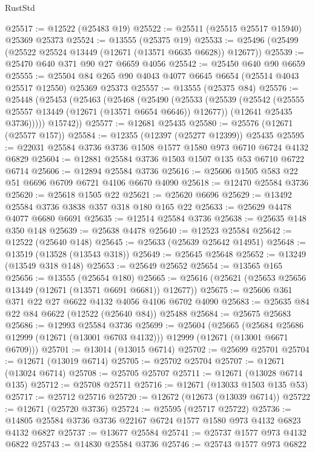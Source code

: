 \begin{lexlean}{RustStd}
\begin{coremodule}
@25517 := @12522 (@25483 @19)
@25522 := @25511 (@25515 @25517 @15940) @25369 @25373
@25524 := @13555 (@25375 @19)
@25533 := @25496 (@25499 (@25522 @25524 @13449 (@12671 (@13571 @6635 @6628)) @12677))
@25539 := @25470 @640 @371 @90 @27 @6659 @4056
@25542 := @25450 @640 @90 @6659
@25555 := @25504 @84 @265 @90 @4043 @4077 @6645 @6654 (@25514 @4043 @25517 @12550) @25369 @25373
@25557 := @13555 (@25375 @84)
@25576 := @25448
    (@25453
      (@25463
        (@25468
          (@25490
            (@25533
              (@25539
                (@25542 (@25555 @25557 @13449 (@12671 (@13571 @6654 @6646)) @12677))
                (@12641 @25435 @3736)))))
        @15742))
@25577 := @12681 @25435
@25580 := @25576 (@12671 (@25577 @157))
@25584 := @12355 (@12397 (@25277 @12399)) @25435
@25595 := @22031 @25584 @3736 @3736 @1508 @1577 @1580 @973 @6710 @6724 @4132 @6829
@25604 := @12881 @25584 @3736 @1503 @1507 @135 @53 @6710 @6722 @6714
@25606 := @12894 @25584 @3736
@25616 := @25606 @1505 @583 @22 @51 @6696 @6709 @6721 @4106 @6670 @4090
@25618 := @12470 @25584 @3736
@25620 := @25618 @1505 @22
@25621 := @25620 @6696
@25629 := @13492 @25584 @3736 @3838 @357 @318 @180 @165 @22
@25633 := @25629 @4478 @4077 @6680 @6691
@25635 := @12514 @25584 @3736
@25638 := @25635 @148 @350 @148
@25639 := @25638 @4478
@25640 := @12523 @25584
@25642 := @12522 (@25640 @148)
@25645 := @25633 (@25639 @25642 @14951)
@25648 := @13519 (@13528 (@13543 @318))
@25649 := @25645 @25648
@25652 := @13249 (@13549 @318 @148)
@25653 := @25649 @25652
@25654 := @13565 @165
@25656 := @13555 (@25654 @180)
@25665 := @25616 (@25621 (@25653 @25656 @13449 (@12671 (@13571 @6691 @6681)) @12677))
@25675 := @25606 @361 @371 @22 @27 @6622 @4132 @4056 @4106 @6702 @4090
@25683 := @25635 @84 @22 @84 @6622 (@12522 (@25640 @84)) @25488
@25684 := @25675 @25683
@25686 := @12993 @25584 @3736
@25699 := @25604
    (@25665
      (@25684 @25686 @12999 (@12671 (@13001 @6703 @4132)))
      @12999
      (@12671 (@13001 @6671 @6709)))
@25701 := @13014 (@13015 @6714)
@25702 := @25699 @25701
@25704 := @12671 (@13019 @6714)
@25705 := @25702 @25704
@25707 := @12671 (@13024 @6714)
@25708 := @25705 @25707
@25711 := @12671 (@13028 @6714 @135)
@25712 := @25708 @25711
@25716 := @12671 (@13033 @1503 @135 @53)
@25717 := @25712 @25716
@25720 := @12672 (@12673 (@13039 @6714))
@25722 := @12671 (@25720 @3736)
@25724 := @25595 (@25717 @25722)
@25736 := @14805 @25584 @3736 @3736 @22167 @6724 @1577 @1580 @973 @4132 @6823 @4132 @6827
@25737 := @13677 @25584
@25741 := @25737 @1577 @973 @4132 @6822
@25743 := @14830 @25584 @3736
@25746 := @25743 @1577 @973 @6822

\end{coremodule}
\end{lexlean}
